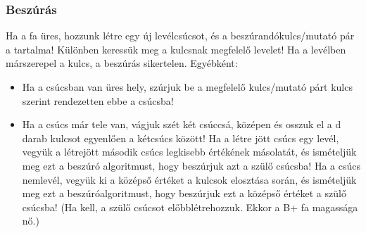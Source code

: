\documentclass[margin=0px]{article}
\begin{document}
\subsubsection{Beszúrás}
Ha a fa üres, hozzunk létre egy új levélcsúcsot, és a beszúrandókulcs/mutató pár a tartalma! 
Különben keressük meg a kulcsnak megfelelő levelet! Ha a levélben márszerepel a kulcs, a beszúrás sikertelen. Egyébként:
\begin{itemize}
    \item Ha a csúcsban van üres hely, szúrjuk be a megfelelő kulcs/mutató párt kulcs szerint rendezetten ebbe a csúcsba!
    \item  Ha a csúcs már tele van, vágjuk szét két csúccsá, középen és osszuk el a d darab kulcsot egyenlően a kétcsúcs között! Ha a létre jött csúcs egy levél, vegyük a létrejött második csúcs legkisebb értékének másolatát, és ismételjük meg ezt a beszúró algoritmust, hogy beszúrjuk azt a szülő csúcsba! Ha a csúcs nemlevél, vegyük ki a középső értéket a kulcsok elosztása során, és ismételjük meg ezt a beszúróalgoritmust, hogy beszúrjuk ezt a középső értéket a szülő csúcsba! (Ha kell, a szülő csúcsot előbblétrehozzuk. Ekkor a B+ fa magassága nő.)
\end{itemize} 
\end{document}
